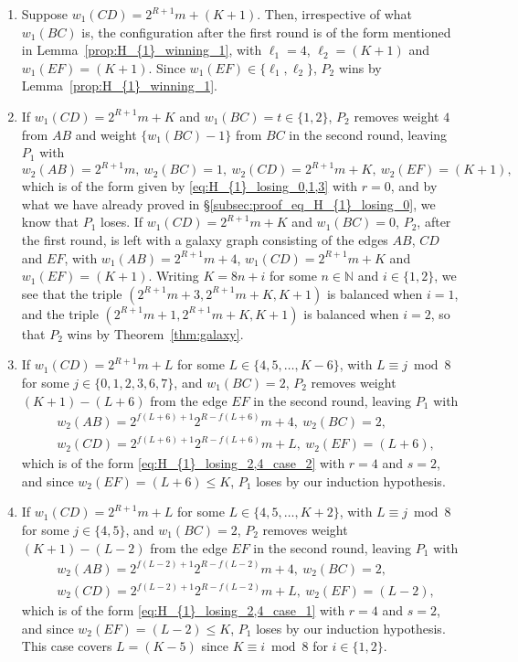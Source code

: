 \documentclass[11pt,reqno]{amsart}
\theoremstyle{definition}
\theoremstyle{definition}
\begin{document}
\begin{enumerate}
\begin{enumerate}
\item Suppose $w_{1}(CD)=2^{R+1}m+(K+1)$. Then, irrespective of what $w_{1}(BC)$ is, the configuration after the first round is of the form mentioned in Lemma~\ref{prop:H_{1}_winning_1}, with $\ell_{1}=4$, $\ell_{2}=(K+1)$ and $w_{1}(EF)=(K+1)$. Since $w_{1}(EF)\in\{\ell_{1},\ell_{2}\}$, $P_{2}$ wins by Lemma~\ref{prop:H_{1}_winning_1}.

\item If $w_{1}(CD)=2^{R+1}m+K$ and $w_{1}(BC)=t \in \{1,2\}$, $P_{2}$ removes weight $4$ from $AB$ and weight $\{w_{1}(BC)-1\}$ from $BC$ in the second round, leaving $P_{1}$ with
\begin{equation}
w_{2}(AB)=2^{R+1}m,\ w_{2}(BC)=1,\ w_{2}(CD)=2^{R+1}m+K,\ w_{2}(EF)=(K+1),\nonumber
\end{equation}
which is of the form given by \eqref{eq:H_{1}_losing_0,1,3} with $r=0$, and by what we have already proved in \S\ref{subsec:proof_eq_H_{1}_losing_0}, we know that $P_{1}$ loses. If $w_{1}(CD)=2^{R+1}m+K$ and $w_{1}(BC)=0$, $P_{2}$, after the first round, is left with a galaxy graph consisting of the edges $AB$, $CD$ and $EF$, with $w_{1}(AB)=2^{R+1}m+4$, $w_{1}(CD)=2^{R+1}m+K$ and $w_{1}(EF)=(K+1)$. Writing $K=8n+i$ for some $n\in\mathbb{N}$ and $i\in\{1,2\}$, we see that the triple $(2^{R+1}m+3,2^{R+1}m+K,K+1)$ is balanced when $i=1$, and the triple $(2^{R+1}m+1,2^{R+1}m+K,K+1)$ is balanced when $i=2$, so that $P_{2}$ wins by Theorem~\ref{thm:galaxy}. 

\item If $w_{1}(CD)=2^{R+1}m+L$ for some $L \in \{4,5,\ldots,K-6\}$, with $L \equiv j \bmod 8$ for some $j \in \{0,1,2,3,6,7\}$, and $w_{1}(BC)=2$, $P_{2}$ removes weight $(K+1)-(L+6)$ from the edge $EF$ in the second round, leaving $P_{1}$ with
\begin{align}
{}&w_{2}(AB)=2^{f(L+6)+1}2^{R-f(L+6)}m+4,\ w_{2}(BC)=2,\nonumber\\
{}&w_{2}(CD)=2^{f(L+6)+1}2^{R-f(L+6)}m+L,\ w_{2}(EF)=(L+6),\nonumber
\end{align}
which is of the form \eqref{eq:H_{1}_losing_2,4_case_2} with $r=4$ and $s=2$, and since $w_{2}(EF)=(L+6)\leqslant K$, $P_{1}$ loses by our induction hypothesis.

\item If $w_{1}(CD)=2^{R+1}m+L$ for some $L \in \{4,5,\ldots,K+2\}$, with $L \equiv j \bmod 8$ for some $j \in \{4,5\}$, and $w_{1}(BC)=2$, $P_{2}$ removes weight $(K+1)-(L-2)$ from the edge $EF$ in the second round, leaving $P_{1}$ with
\begin{align}
{}&w_{2}(AB)=2^{f(L-2)+1}2^{R-f(L-2)}m+4,\ w_{2}(BC)=2,\nonumber\\
{}&w_{2}(CD)=2^{f(L-2)+1}2^{R-f(L-2)}m+L,\ w_{2}(EF)=(L-2),\nonumber
\end{align}
which is of the form \eqref{eq:H_{1}_losing_2,4_case_1} with $r=4$ and $s=2$, and since $w_{2}(EF)=(L-2)\leqslant K$, $P_{1}$ loses by our induction hypothesis. This case covers $L=(K-5)$ since $K \equiv i \bmod 8$ for $i \in \{1,2\}$.


\end{enumerate}
\end{enumerate}
\end{document}
